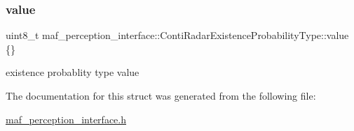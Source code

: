 \subsubsection{\texorpdfstring{value}{value}}
{\footnotesize\ttfamily uint8\+\_\+t maf\+\_\+perception\+\_\+interface\+::\+Conti\+Radar\+Existence\+Probability\+Type\+::value \{\}}



existence probablity type value 



The documentation for this struct was generated from the following file\+:\begin{DoxyCompactItemize}
\item 
\hyperlink{maf__perception__interface_8h}{maf\+\_\+perception\+\_\+interface.\+h}\end{DoxyCompactItemize}
